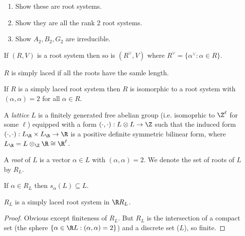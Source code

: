 \documentclass[a4paper]{article}
\begin{document}
\begin{ex}\leavevmode
  \begin{enumerate}
  \item Show these are root systems.
  \item Show they are all the rank 2 root systems.
  \item Show \(A_2, B_2, G_2\) are irreducible.
  \end{enumerate}
\end{ex}

\begin{ex}
  If \((R, V)\) is a root system then so is \((R^\vee, V)\) where \(R^\vee = \{\alpha^\vee: \alpha \in R\}\).
\end{ex}

\begin{definition}
  \(R\) is simply laced if all the roots have the samle length.
\end{definition}

\begin{ex}
  If \(R\) is a simply laced root system then \(R\) is isomorphic to a root system with \((\alpha, \alpha) = 2\) for all \(\alpha \in R\).
\end{ex}

\begin{definition}[lattice]
  A \emph{lattice} \(L\) is a finitely generated free abelian group (i.e. isomoprhic to \(\Z^\ell\) for some \(\ell\)) equipped with a form \((\cdot, \cdot): L \otimes L \to \Z\) such that the induced form \((\cdot, \cdot): L_\R \times L_\R \to \R\) is a positive definite symmetric bilinear form, where \(L_\R = L \otimes_\Z \R \cong \R^\ell\).

  A \emph{root} of \(L\) is a vector \(\alpha \in L\) with \((\alpha, \alpha) = 2\). We denote the set of roots of \(L\) by \(R_L\).
\end{definition}

\begin{ex}
  If \(\alpha \in R_L\) then \(s_\alpha(L) \subseteq L\).
\end{ex}

\begin{lemma}
  \(R_L\) is a simply laced root system in \(\R R_L\).
\end{lemma}

\begin{proof}
  Obvious except finiteness of \(R_L\). But \(R_L\) is the intersection of a compact set (the sphere \(\{\alpha \in \R L: (\alpha, \alpha) = 2\}\)) and a discrete set (\(L\)), so finite.
\end{proof}
\end{document}
